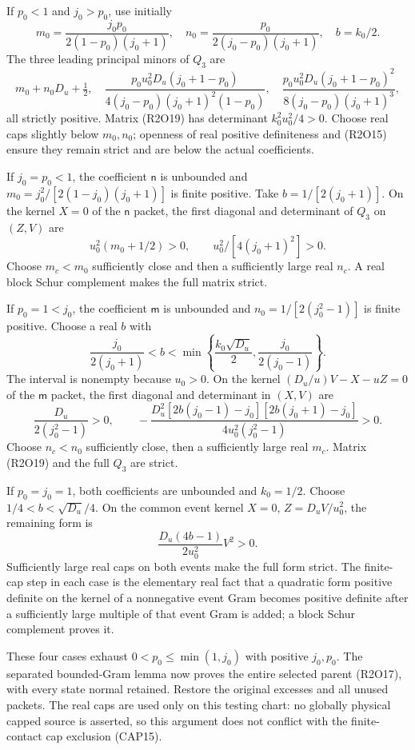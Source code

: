 If $p_0<1$ and $j_0>p_0$, use initially
\[
m_0=\frac{j_0p_0}{2(1-p_0)(j_0+1)},\quad
n_0=\frac{p_0}{2(j_0-p_0)(j_0+1)},\quad b=k_0/2.
\]
The three leading principal minors of $Q_3$ are
\[
m_0+n_0D_u+\tfrac12,\quad
\frac{p_0u_0^2D_u(j_0+1-p_0)}
 {4(j_0-p_0)(j_0+1)^2(1-p_0)},\quad
\frac{p_0u_0^2D_u(j_0+1-p_0)^2}
 {8(j_0-p_0)(j_0+1)^3},
\tag{R2O21}
\]
all strictly positive.  Matrix (R2O19) has determinant
$k_0^2u_0^2/4>0$.  Choose real caps slightly below $m_0,n_0$;
openness of real positive definiteness and (R2O15) ensure they remain
strict and are below the actual coefficients.

If $j_0=p_0<1$, the coefficient $\mathsf n$ is unbounded and
$m_0=j_0^2/[2(1-j_0)(j_0+1)]$ is finite positive.  Take
$b=1/[2(j_0+1)]$.  On the kernel $X=0$ of the $\mathsf n$ packet,
the first diagonal and determinant of $Q_3$ on $(Z,V)$ are
\[
u_0^2(m_0+1/2)>0,\qquad
u_0^2/[4(j_0+1)^2]>0.
\tag{R2O22}
\]
Choose $m_c<m_0$ sufficiently close and then a sufficiently large
real $n_c$.  A real block Schur complement makes the full matrix strict.

If $p_0=1<j_0$, the coefficient $\mathsf m$ is unbounded and
$n_0=1/[2(j_0^2-1)]$ is finite positive.  Choose a real $b$ with
\[
\frac{j_0}{2(j_0+1)}<b<
\min\left\{\frac{k_0\sqrt{D_u}}2,
                 \frac{j_0}{2(j_0-1)}\right\}.
\]
The interval is nonempty because $u_0>0$.  On the kernel
$(D_u/u)V-X-uZ=0$ of the $\mathsf m$ packet, the first diagonal
and determinant in $(X,V)$ are
\[
\frac{D_u}{2(j_0^2-1)}>0,\qquad
-\frac{D_u^2[2b(j_0-1)-j_0][2b(j_0+1)-j_0]}
       {4u_0^2(j_0^2-1)}>0.
\tag{R2O23}
\]
Choose $n_c<n_0$ sufficiently close, then a sufficiently large real
$m_c$.  Matrix (R2O19) and the full $Q_3$ are strict.

If $p_0=j_0=1$, both coefficients are unbounded and $k_0=1/2$.
Choose $1/4<b<\sqrt{D_u}/4$.  On the common event kernel
$X=0$, $Z=D_uV/u_0^2$, the remaining form is
\[
\frac{D_u(4b-1)}{2u_0^2}V^2>0.
\tag{R2O24}
\]
Sufficiently large real caps on both events make the full form strict.
The finite-cap step in each case is the elementary real fact that a
quadratic form positive definite on the kernel of a nonnegative event
Gram becomes positive definite after a sufficiently large multiple of
that event Gram is added; a block Schur complement proves it.

These four cases exhaust $0<p_0\leq\min(1,j_0)$ with positive $j_0,p_0$.
The separated bounded-Gram lemma now proves the entire selected parent
(R2O17), with every state normal retained.  Restore the original excesses
and all unused packets.  The real caps are used only on this testing
chart: no globally physical capped source is asserted, so this argument
does not conflict with the finite-contact cap exclusion (CAP15).

